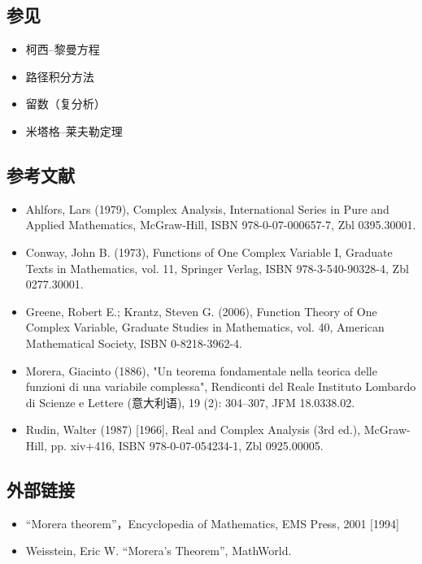 \subsection{参见}
\begin{itemize}
\item 柯西–黎曼方程
\item 路径积分方法
\item 留数（复分析）
\item 米塔格–莱夫勒定理
\end{itemize}
\subsection{参考文献}
\begin{itemize}
\item Ahlfors, Lars (1979), Complex Analysis, International Series in Pure and Applied Mathematics, McGraw-Hill, ISBN 978-0-07-000657-7, Zbl 0395.30001.
\item Conway, John B. (1973), Functions of One Complex Variable I, Graduate Texts in Mathematics, vol. 11, Springer Verlag, ISBN 978-3-540-90328-4, Zbl 0277.30001.
\item Greene, Robert E.; Krantz, Steven G. (2006), Function Theory of One Complex Variable, Graduate Studies in Mathematics, vol. 40, American Mathematical Society, ISBN 0-8218-3962-4.
\item Morera, Giacinto (1886), "Un teorema fondamentale nella teorica delle funzioni di una variabile complessa", Rendiconti del Reale Instituto Lombardo di Scienze e Lettere (意大利语), 19 (2): 304–307, JFM 18.0338.02.
\item Rudin, Walter (1987) [1966], Real and Complex Analysis (3rd ed.), McGraw-Hill, pp. xiv+416, ISBN 978-0-07-054234-1, Zbl 0925.00005.
\end{itemize}
\subsection{外部链接}
\begin{itemize}
\item “Morera theorem”，Encyclopedia of Mathematics, EMS Press, 2001 [1994]
\item Weisstein, Eric W. “Morera's Theorem”, MathWorld.
\end{itemize}
